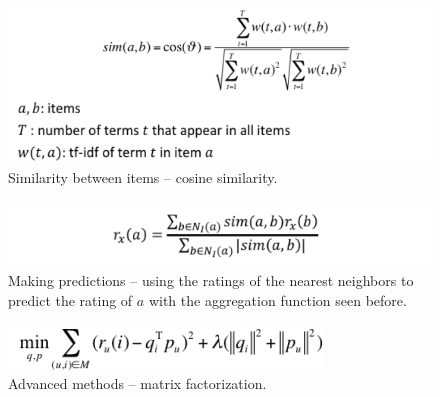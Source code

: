     \begin{figure}[htp]
      \centering
        \includegraphics[width=.6\textwidth]{images/simit.png}
        \caption{Similarity between items -- cosine similarity.}
        \label{fig:simit}
    \end{figure}

    \begin{figure}[htp]
      \centering
        \includegraphics[width=.6\textwidth]{images/simit2.png}
        \caption{Making predictions -- using the ratings of the nearest neighbors to predict the rating of $a$ with the aggregation function seen before.}
        \label{fig:simit2}
    \end{figure}

    \begin{figure}[htp]
      \centering
        \includegraphics[width=.4\textwidth]{images/ammf.png}
        \caption{Advanced methods -- matrix factorization.}
        \label{fig:ammf}
    \end{figure}

\newpage

